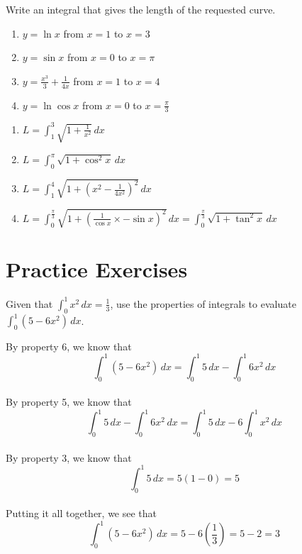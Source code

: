 \begin{Exercise}[label=length1]
Write an integral that gives the length of the requested curve.
	\begin{enumerate}
	\item $y = \ln{x}$ from $x = 1$ to $x = 3$
	\item $y = \sin{x}$ from $x = 0$ to $x = \pi$
	\item $y = \frac{x^3}{3} + \frac{1}{4x}$ from $x = 1$ to $x = 4$
	\item $y = \ln{\cos{x}}$ from $x = 0$ to $x = \frac{\pi}{3}$
	\end{enumerate}	 
\end{Exercise}

\begin{Answer}[ref=length1]
	\begin{enumerate}
	\item $L = \int_{1}^{3} \sqrt{1 + \frac{1}{x^2}}\,dx$
	\item $L = \int_{0}^{\pi} \sqrt{1 + \cos^2{x}}\,dx$
	\item $L = \int_{1}^{4} \sqrt{1 + (x^2-\frac{1}{4x^2})^2}\,dx$
	\item $L = \int_{0}^{\frac{\pi}{3}} \sqrt{1 + (\frac{1}{\cos{x}} 
	\times - \sin{x})^2}\,dx = \int_{0}^{\frac{\pi}{3}} \sqrt{1 + 
	\tan^2{x}}\,dx$
	\end{enumerate}
\end{Answer}


\section{Practice Exercises}
\begin{Exercise}[label=defint2]
Given that $\int_{0}^{1} x^2\,dx = \frac{1}{3}$, use the properties 
of integrals to evaluate $\int_{0}^{1} (5-6x^2)\,dx$. 
\end{Exercise}

\begin{Answer}[ref=defint2]
By property 6, we know that $$\int_{0}^{1} (5-6x^2)\,dx = \int_{0}^{1} 
5\,dx - \int_{0}^{1} 6x^2\,dx$$\\
By property 5, we know that $$\int_{0}^{1} 5\,dx - \int_{0}^{1} 6x^2\,
dx = \int_{0}^{1} 5\,dx - 6\int_{0}^{1} x^2\,dx$$\\
By property 3, we know that $$\int_{0}^{1} 5\,dx = 5(1 - 0) = 5$$\\
Putting it all together, we see that $$\int_{0}^{1} (5-6x^2)\,dx = 5 
- 6(\frac{1}{3}) = 5 - 2 = 3$$
\end{Answer}

